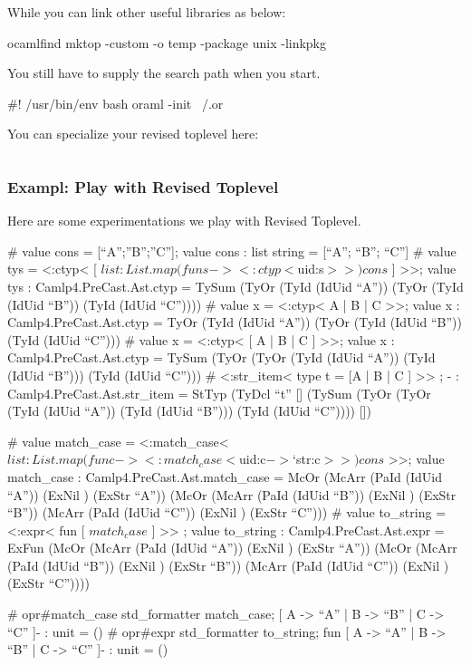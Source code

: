 While you can link other useful libraries as below:

\begin{bashcode}
  ocamlfind mktop -custom -o temp -package unix -linkpkg
\end{bashcode}

You still have to supply the search path when you start.

\begin{bashcode}
#! /usr/bin/env bash
oraml -init ~/.or  
\end{bashcode}

You can specialize your revised toplevel here:

\inputminted[fontsize=\scriptsize]{ocaml}{homedir/.or}

\subsubsection{Exampl: Play with Revised Toplevel}
\label{Try New Revised Toplevel}

Here are some experimentations  we play with Revised Toplevel.

\begin{ocamlcode}
# value cons = [``A'';''B'';''C''];
value cons : list string = [``A''; ``B''; ``C'']
# value tys = <:ctyp< [ $list: List.map (fun s -> <:ctyp< $uid:s$ >>)
cons $ ] >>;
value tys : Camlp4.PreCast.Ast.ctyp =
  TySum 
   (TyOr  (TyId  (IdUid  ``A''))
     (TyOr  (TyId  (IdUid  ``B'')) (TyId  (IdUid  ``C''))))
# value x  = <:ctyp< A | B | C >>;
value x : Camlp4.PreCast.Ast.ctyp =
  TyOr  (TyId  (IdUid  ``A''))
   (TyOr  (TyId  (IdUid  ``B'')) (TyId  (IdUid  ``C'')))
# value x  = <:ctyp< [ A | B | C ] >>;
value x : Camlp4.PreCast.Ast.ctyp =
  TySum 
   (TyOr  (TyOr  (TyId  (IdUid  ``A'')) (TyId  (IdUid  ``B'')))
   (TyId  (IdUid  ``C'')))
# <:str_item< type t = [A | B | C ] >> ;
- : Camlp4.PreCast.Ast.str_item =
StTyp 
 (TyDcl  ``t'' []
   (TySum 
     (TyOr  (TyOr  (TyId  (IdUid  ``A'')) (TyId  (IdUid  ``B'')))
       (TyId  (IdUid  ``C''))))
   [])
\end{ocamlcode}


\begin{ocamlcode}
# value match_case = <:match_case< $list: List.map (fun c ->
<:match_case< $uid:c$ -> $`str:c$ >>) cons$ >>;
value match_case : Camlp4.PreCast.Ast.match_case =
  McOr  (McArr  (PaId  (IdUid  ``A'')) (ExNil ) (ExStr  ``A''))
   (McOr  (McArr  (PaId  (IdUid  ``B'')) (ExNil ) (ExStr  ``B''))
     (McArr  (PaId  (IdUid  ``C'')) (ExNil ) (ExStr  ``C'')))
# value to_string = <:expr< fun [ $match_case$ ] >> ;
value to_string : Camlp4.PreCast.Ast.expr =
  ExFun 
   (McOr  (McArr  (PaId  (IdUid  ``A'')) (ExNil ) (ExStr  ``A''))
     (McOr  (McArr  (PaId  (IdUid  ``B'')) (ExNil ) (ExStr  ``B''))
       (McArr  (PaId  (IdUid  ``C'')) (ExNil ) (ExStr  ``C''))))
\end{ocamlcode}

\begin{ocamlcode}
# opr#match_case std_formatter match_case;
 [ A -> ``A'' | B -> ``B''
 | C -> ``C'' ]- : unit = ()
# opr#expr std_formatter to_string;
fun [ A -> ``A'' | B -> ``B'' | C -> ``C'' ]- : unit = ()
\end{ocamlcode}


